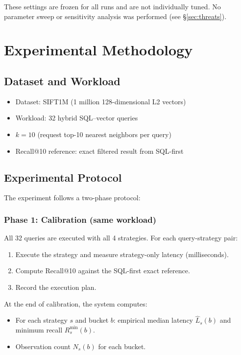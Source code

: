 \documentclass[10pt,twocolumn]{article}
\begin{document}
These settings are frozen for all runs and are not individually tuned. No parameter sweep or sensitivity analysis was performed (see \S\ref{sec:threats}).

\section{Experimental Methodology}
\label{sec:methodology}

\subsection{Dataset and Workload}

\begin{itemize}
\item Dataset: SIFT1M (1 million 128-dimensional L2 vectors)
\item Workload: 32 hybrid SQL--vector queries
\item $k = 10$ (request top-10 nearest neighbors per query)
\item Recall@10 reference: exact filtered result from SQL-first
\end{itemize}

\subsection{Experimental Protocol}

The experiment follows a two-phase protocol:

\subsubsection{Phase 1: Calibration (same workload)}

All 32 queries are executed with all 4 strategies. For each query-strategy pair:
\begin{enumerate}
\item Execute the strategy and measure strategy-only latency (milliseconds).
\item Compute Recall@10 against the SQL-first exact reference.
\item Record the execution plan.
\end{enumerate}

At the end of calibration, the system computes:
\begin{itemize}
\item For each strategy $s$ and bucket $b$: empirical median latency $\widehat{L}_s(b)$ and minimum recall $R^{\min}_s(b)$.
\item Observation count $N_s(b)$ for each bucket.
\end{itemize}
\end{document}
